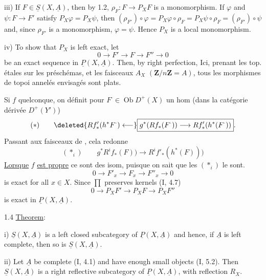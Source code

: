 iii) If $F\in\underline{S}(X,\underline{A})$, then by 1.2, $\rho_F:F\longrightarrow P_XF$ is a monomorphism. If $\varphi$ and $\psi:F\longrightarrow F'$ satisfy $P_X\varphi=P_X\psi$, then $(\rho_{F'})\circ\varphi=P_X\varphi\circ\rho_F=P_X\psi\circ\rho_F=(\rho_{F'})\circ\psi$ and, since $\rho_{F'}$ is a monomorphism, $\varphi=\psi$. Hence $P_X$ is a local monomorphism.

iv) To show that $P_X$ is left exact, let
\[
0\longrightarrow F'\longrightarrow F\longrightarrow F''\longrightarrow0
\]
be an exact sequence in $\underline{P}(X,\underline{A})$. Then, by right perfection,
Ici, prenant les top. étales sur les préschémas, et les faisceaux  $A_X$ $(\mathbf{Z}/n\mathbf{Z}=A)$, tous les morphismes de topoi annelés envisagés sont plats.


Si $f$ quelconque, on définit pour $F^\cdot\in\operatorname{Ob}D^+(X)$ un hom (dans la catégorie dérivée $D^+(Y')$)
\[
(*)\qquad \deleted{Rf'_*(h^*F^\cdot)\longleftarrow}\boxed{g^*(Rf_*(F^\cdot))\longrightarrow Rf'_*(h^*(F^\cdot))}.
\]
Passant aux faisceaux de , cela redonne
\[
(*_i)\qquad g^*R^if_*(F))\longrightarrow R^if'_*(h^*(F)))
\]
\uline{Lorsque} $f$ \uline{est propre} ce sont des isom, puisque on sait que les $(*_i)$ le sont.
\[
0\longrightarrow F'_x\longrightarrow F_x\longrightarrow F''_x\longrightarrow0
\]
is exact for all $x\in X$. Since $\prod$ preserves kernels (I, 4.7)
\[
0\longrightarrow P_XF'\longrightarrow P_XF\longrightarrow P_XF''
\]
is exact in $\underline{P}(X,\underline{A})$.

1.4 \uline{Theorem}:

i) $\underline{S}(X,\underline{A})$ is a left closed subcategory of $\underline{P}(X,\underline{A})$ and hence, if $\underline{A}$ is left complete, then so is $\underline{S}(X,\underline{A})$.

ii) Let $\underline{A}$ be complete (I, 4.1) and have enough small objects (I, 5.2). Then $\underline{S}(X,\underline{A})$ is a right reflective subcategory of $\underline{P}(X,\underline{A})$, with reflection $R_X$.

